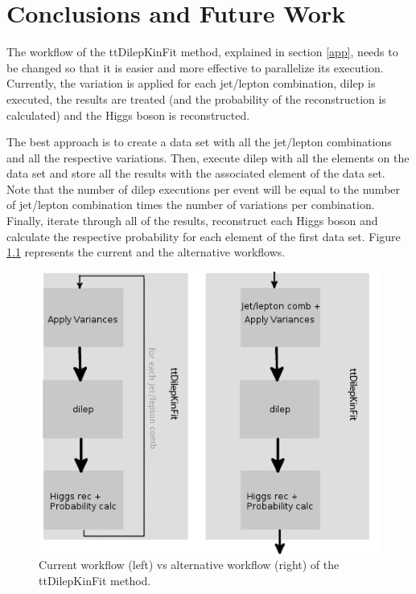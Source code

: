 
\chapter{Conclusions and Future Work}

The workflow of the ttDilepKinFit method, explained in section \ref{app}, needs to be changed so that it is easier and more effective to parallelize its execution. Currently, the variation is applied for each jet/lepton combination, dilep is executed, the results are treated (and the probability of the reconstruction is calculated) and the Higgs boson is reconstructed.

The best approach is to create a data set with all the jet/lepton combinations and all the respective variations. Then, execute dilep with all the elements on the data set and store all the results with the associated element of the data set. Note that the number of dilep executions per event will be equal to the number of jet/lepton combination times the number of variations per combination. Finally, iterate through all of the results, reconstruct each Higgs boson and calculate the respective probability for each element of the first data set. Figure \ref{fig:pipeline} represents the current and the alternative workflows.

\begin{figure}[!htp]
	\begin{center}
		\includegraphics[scale=0.5]{../../common/img/pipeline.png}
		\caption{Current workflow (left) vs alternative workflow (right) of the ttDilepKinFit method.}
		\label{fig:pipeline}
	\end{center}
\end{figure}

